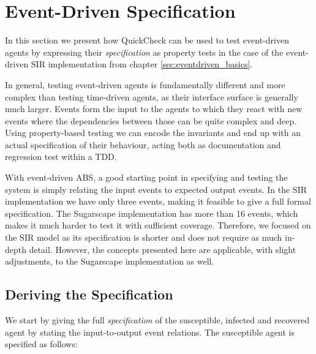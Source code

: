 \section{Event-Driven Specification}
In this section we present how QuickCheck can be used to test event-driven agents by expressing their \textit{specification} as property tests in the case of the event-driven SIR implementation from chapter \ref{sec:eventdriven_basics}.

In general, testing event-driven agents is fundamentally different and more complex than testing time-driven agents, as their interface surface is generally much larger. Events form the input to the agents to which they react with new events where the dependencies between those can be quite complex and deep. Using property-based testing we can encode the invariants and end up with an actual specification of their behaviour, acting both as documentation and regression test within a TDD.

With event-driven ABS, a good starting point in specifying and testing the system is simply relating the input events to expected output events. In the SIR implementation we have only three events, making it feasible to give a full formal specification. The Sugarscape implementation has more than 16 events, which makes it much harder to test it with sufficient coverage. Therefore, we focused on the SIR model as its specification is shorter and does not require as much in-depth detail. However, the concepts presented here are applicable, with slight adjustments, to the Sugarscape implementation as well.

\subsection{Deriving the Specification}
We start by giving the full \textit{specification} of the susceptible, infected and recovered agent by stating the input-to-output event relations. The susceptible agent is specified as follows:

